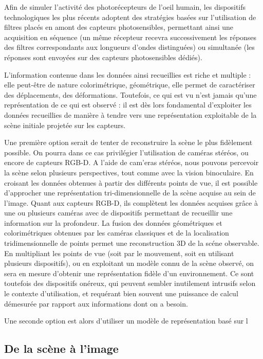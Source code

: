 Afin de simuler l'activité des photorécepteurs de l'oeil humain, les 
dispositifs technologiques les plus récents adoptent des stratégies basées sur 
l'utilisation de filtres placés en amont des capteurs photosensibles, 
permettant 
ainsi une acquisition en séquence (un même récepteur recevra successivement les 
réponses des filtres correspondants aux longueurs d'ondes distinguées) ou 
simultanée (les réponses sont envoyées sur des capteurs photosensibles dédiés).
  
L'information contenue dans les données ainsi recueillies est riche et multiple 
: elle peut-être de nature colorimétrique, géométrique, elle permet de 
ca\-ractériser des déplacements, des déformations. Toutefois, ce qui est vu 
n'est jamais qu'une représentation de ce qui est observé : il est d\`es lors 
fondamental d'exploiter les donn\'ees recueillies de mani\`ere \`a tendre 
vers une repr\'esentation exploitable de la scène initiale projetée sur les 
capteurs.

Une premi\`ere option serait de tenter de reconstruire la sc\`ene le plus 
fid\`element possible. On pourra dans ce cas privil\'egier l'utilisation de 
cam\'eras st\'er\'eos, ou encore de capteurs RGB-D. A l'aide de cam'eras 
st\'er\'eos, nous pouvons percevoir la sc\`ene selon plusieurs perspectives, 
tout comme avec la vision binoculaire. En croisant les donn\'ees obtenues \`a 
partir des diff\'erents points de vue, il est possible d'approcher une 
repr\'esentation tri-dimensionnelle de la sc\`ene acquise au sein de l'image. 
Quant aux capteurs RGB-D, ils compl\`etent les donn\'ees acquises gr\^ace \`a 
une ou plusieurs cam\'eras avec de dispositifs permettant de recueillir une 
information sur la profondeur. La fusion des donn\'ees g\'eom\'etriques et 
colorim\'etriques obtenues par les cam\'eras classiques et de la localisation 
tridimensionnelle de points permet une reconstruction 3D de la sc\'ene 
observable. En multipliant les points de vue (soit par le mouvement, soit en 
utilisant plusieurs dispositifs), ou en exploitant un mod\`ele connu de la 
sc\`ene observ\'e, on sera en mesure d'obtenir une repr\'esentation fid\`ele 
d'un environnement. Ce sont toutefois des dispositifs on\'ereux, qui peuvent 
sembler inutilement intrusifs selon le contexte d'utilisation, et requ\'erant 
bien souvent une puissance de calcul d\'emesur\'ee par rapport aux informations 
dont on a besoin.

Une seconde option est alors d'utiliser un mod\`ele de repr\'esentation bas\'e 
sur l

 
\subsection{De la scène à l'image} \label{chap1-0-1}

